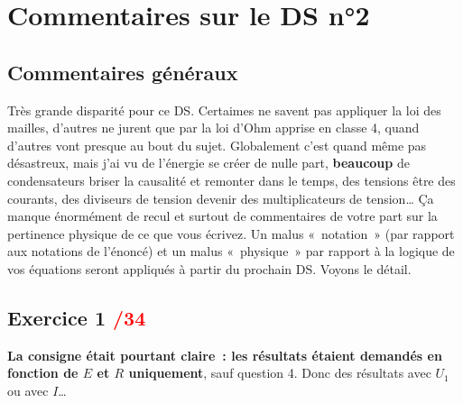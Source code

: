 \documentclass[a4paper, 10pt, final, garamond]{book}
\begin{document}
\setcounter{chapter}{1}

\chapter{Commentaires sur le DS n°2}

\section{Commentaires généraux}

Très grande disparité pour ce DS. Certaimes ne savent pas appliquer la loi des
mailles, d'autres ne jurent que par la loi d'Ohm apprise en classe 4\ieme, quand
d'autres vont presque au bout du sujet. Globalement c'est quand même pas
désastreux, mais j'ai vu de l'énergie se créer de nulle part, \textbf{beaucoup}
de condensateurs briser la causalité et remonter dans le temps, des tensions
être des courants, des diviseurs de tension devenir des multiplicateurs de
tension… Ça manque énormément de recul et surtout de commentaires de votre part
sur la pertinence physique de ce que vous écrivez. Un malus «~notation~» (par
rapport aux notations de l'énoncé) et un malus «~physique~» par rapport à la
logique de vos équations seront appliqués à partir du prochain DS. Voyons le
détail.


\section{Exercice 1 \hfill \textcolor{red}{/34}}

\textbf{La consigne était pourtant claire~: les résultats étaient demandés en
fonction de $E$ et $R$ uniquement}, sauf question 4. Donc des résultats avec
$U_1$ ou avec $I$…
\end{document}

